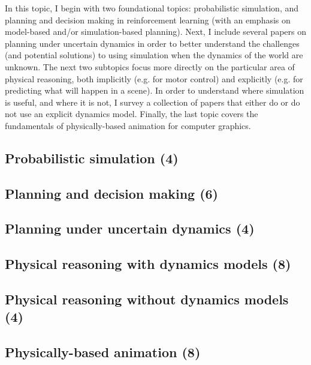 \documentclass{article}
\begin{document}
In this topic, I begin with two foundational topics: probabilistic simulation, and planning and decision making in reinforcement learning (with an emphasis on model-based and/or simulation-based planning).
Next, I include several papers on planning under uncertain dynamics in order to better understand the challenges (and potential solutions) to using simulation when the dynamics of the world are unknown.
The next two subtopics focus more directly on the particular area of physical reasoning, both implicitly (e.g. for motor control) and explicitly (e.g. for predicting what will happen in a scene).
In order to understand where simulation is useful, and where it is not, I survey a collection of papers that either do or do not use an explicit dynamics model.
Finally, the last topic covers the fundamentals of physically-based animation for computer graphics.

\subsection{Probabilistic simulation (4)}

\subsection{Planning and decision making (6)}

\subsection{Planning under uncertain dynamics (4)}

\subsection{Physical reasoning with dynamics models (8)}

\subsection{Physical reasoning without dynamics models (4)}

\subsection{Physically-based animation (8)}
\end{document}
